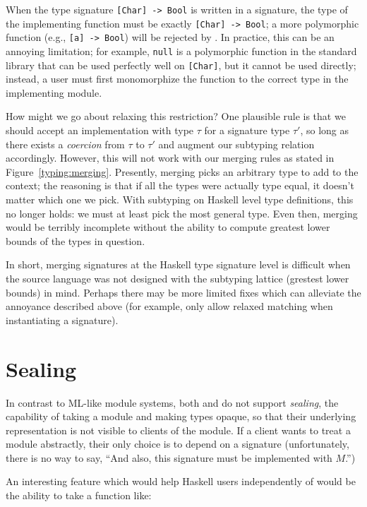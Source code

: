 When the type signature \verb|[Char] -> Bool| is written in a signature,
the type of the implementing function must be exactly \verb|[Char] -> Bool|;
a more polymorphic function (e.g., \verb|[a] -> Bool|) will be rejected
by \Backpack{}.
In practice, this can be an annoying limitation; for example, \verb|null|
is a polymorphic function in the standard library that can be used
perfectly well on \verb|[Char]|, but it cannot be used directly; instead,
a user must first monomorphize the function to the correct type in the
implementing module.

How might we go about relaxing this restriction?  One plausible rule is
that we should accept an implementation with type $\tau$ for a signature
type $\tau'$, so long as there exists a \emph{coercion} from $\tau$ to
$\tau'$ and augment our subtyping relation accordingly.  However, this will
not work with our merging rules as stated in Figure~\ref{typing:merging}.
Presently, merging picks an arbitrary type to add to the context; the reasoning
is that if all the types were actually type equal, it doesn't matter which
one we pick.  With subtyping on Haskell level type definitions, this no
longer holds: we must at least pick the most general type.  Even then,
merging would be terribly incomplete without the ability to compute
greatest lower bounds of the types in question.

In short, merging signatures at the Haskell type signature level is difficult
when the source language was not designed with the subtyping lattice (grestest
lower bounds) in mind.  Perhaps there may be more limited fixes which can
alleviate the annoyance described above (for example, only allow relaxed
matching when instantiating a signature).

\label{sec:sealing}
\section{Sealing}

In contrast to ML-like module systems, both \Backpack{} and \OldBackpack{} do not
support \emph{sealing}, the capability of taking a module and making
types opaque, so that their underlying representation is not visible
to clients of the module.  If a client wants to treat a module abstractly,
their only choice is to depend on a signature (unfortunately, there is no
way to say, ``And also, this signature must be implemented with $M$.'')

An interesting feature which would help Haskell users independently of
\Backpack{} would be the ability to take a function like:

